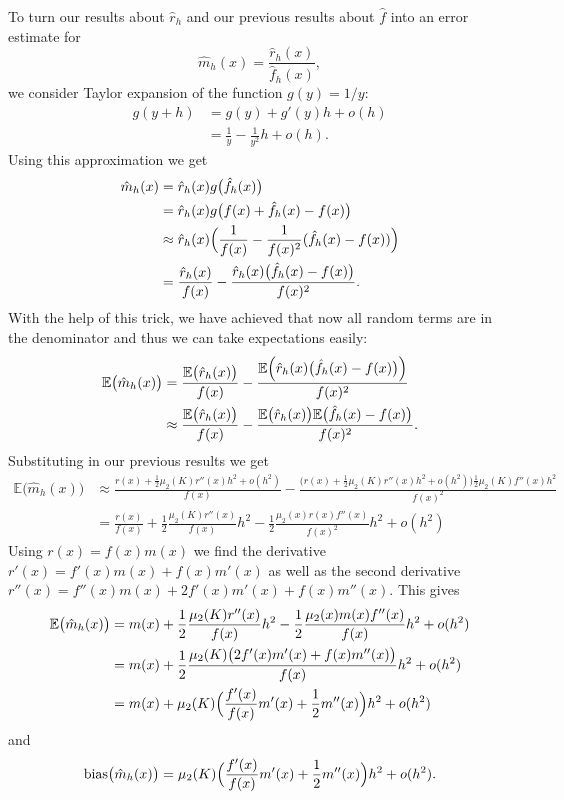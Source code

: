 \documentclass[
  a4paper,
]{article}
\theoremstyle{definition}
\theoremstyle{definition}
\theoremstyle{definition}
\theoremstyle{definition}
\theoremstyle{remark}
\begin{document}
To turn our results about \(\hat r_h\) and our previous results about
\(\hat f\) into an error estimate for
\begin{equation*}
  \hat m_h(x)
  = \frac{\hat r_h(x)}{\hat f_h(x)},
\end{equation*}
we consider Taylor expansion of the function \(g(y) = 1/y\):
\begin{align*}
  g(y + h)
  &= g(y) + g'(y) h + o(h) \\
  &= \frac1y - \frac{1}{y^2} h + o(h).
\end{align*}
Using this approximation we get
\begin{align*}
  \hat m_h(x)
  &= \hat r_h(x) g\bigl( \hat f_h(x) \bigr) \\
  &= \hat r_h(x) g\bigl( f(x) + \hat f_h(x) - f(x) \bigr) \\
  &\approx \hat r_h(x) \Bigl( \frac{1}{f(x)} - \frac{1}{f(x)^2} (\hat f_h(x) - f(x)) \Bigr) \\
  &= \frac{\hat r_h(x)}{f(x)} - \frac{\hat r_h(x) \bigl(\hat f_h(x) - f(x) \bigr)}{f(x)^2}.
\end{align*}
With the help of this trick, we have achieved that now all random terms
are in the denominator and thus we can take expectations easily:
\begin{align*}
  \mathbb{E}\bigl( \hat m_h(x) \bigr)
  &= \frac{\mathbb{E}\bigl( \hat r_h(x) \bigr)}{f(x)}
      - \frac{\mathbb{E}\Bigl( \hat r_h(x) \bigl(\hat f_h(x) - f(x) \bigr) \Bigr)}{f(x)^2} \\
  &\approx \frac{\mathbb{E}\bigl( \hat r_h(x) \bigr)}{f(x)}
      - \frac{\mathbb{E}\bigl( \hat r_h(x) \bigr) \mathbb{E}\bigl( \hat f_h(x) - f(x) \bigr)}{f(x)^2}.
\end{align*}
Substituting in our previous results we get
\begin{align*}
  \mathbb{E}\bigl( \hat m_h(x) \bigr)
  &\approx \frac{r(x) + \frac12 \mu_2(K) r''(x) h^2 + o(h^2)}{f(x)}
      - \frac{\bigl( r(x) + \frac12 \mu_2(K) r''(x) h^2 + o(h^2) \bigr)
          \frac12 \mu_2(K) f''(x) h^2}{f(x)^2} \\
  &= \frac{r(x)}{f(x)}
    + \frac12 \frac{\mu_2(K) r''(x)}{f(x)} h^2
    - \frac12 \frac{\mu_2(x) r(x) f''(x)}{f(x)^2} h^2
    + o(h^2)
\end{align*}
Using \(r(x) = f(x) m(x)\) we find the derivative
\(r'(x) = f'(x) m(x) + f(x) m'(x)\)
as well as the second derivative
\(r''(x) = f''(x) m(x) + 2 f'(x) m'(x) + f(x) m''(x)\).
This gives
\begin{align*}
  \mathbb{E}\bigl( \hat m_h(x) \bigr)
  &= m(x)
    + \frac12 \frac{\mu_2(K) r''(x)}{f(x)} h^2
    - \frac12 \frac{\mu_2(x) m(x) f''(x)}{f(x)} h^2
    + o(h^2) \\
  &= m(x)
    + \frac12 \frac{\mu_2(K) \bigl(2 f'(x) m'(x) + f(x) m''(x)\bigr)}{f(x)} h^2
    + o(h^2) \\
  &= m(x)
    + \mu_2(K) \Bigl( \frac{f'(x)}{f(x)} m'(x) + \frac12 m''(x) \Bigr) h^2
    + o(h^2)
\end{align*}
and
\begin{equation*}
  \mathop{\mathrm{bias}}\bigl( \hat m_h(x) \bigr)
  = \mu_2(K) \Bigl( \frac{f'(x)}{f(x)} m'(x) + \frac12 m''(x) \Bigr) h^2
    + o(h^2).
\end{equation*}
\end{document}
